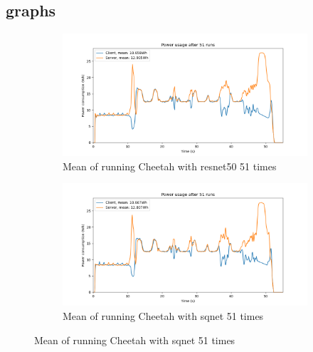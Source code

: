 \documentclass[../thesis.tex]{subfiles}
\begin{document}
\subsection{graphs}
\begin{figure}[hbt!]
    \begin{subfigure}{.475\linewidth}
            \includegraphics[width=\textwidth]{Thesis/Images/Means/mean_cheetah_resnet50.png}
            \caption{Mean of running Cheetah with resnet50 51 times}
            \label{fig:mean_cheetah_resnet50}
    \end{subfigure}\hfill %
    \begin{subfigure}{.475\linewidth}
            \includegraphics[width=\textwidth]{Thesis/Images/Means/mean_cheetah_sqnet.png}
            \caption{Mean of running Cheetah with sqnet 51 times}
            \label{fig:mean_cheetah_sqnet}
    \end{subfigure}

    \medskip %
    

\end{figure}
\end{document}
